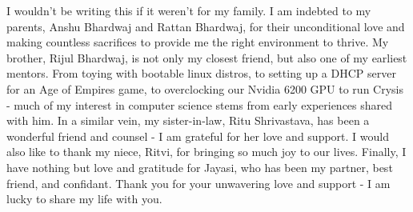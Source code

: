 \begin{acknowledgements}
I wouldn't be writing this if it weren't for my family. I am indebted to my parents, Anshu Bhardwaj and Rattan Bhardwaj, for their unconditional love and making countless sacrifices to provide me the right environment to thrive. My brother, Rijul Bhardwaj, is not only my closest friend, but also one of my earliest mentors. From toying with bootable linux distros, to setting up a DHCP server for an Age of Empires game, to overclocking our Nvidia 6200 GPU to run Crysis - much of my interest in computer science stems from early experiences shared with him. In a similar vein, my sister-in-law, Ritu Shrivastava, has been a wonderful friend and counsel - I am grateful for her love and support. I would also like to thank my niece, Ritvi, for bringing so much joy to our lives. Finally, I have nothing but love and gratitude for Jayasi, who has been my partner, best friend, and confidant. Thank you for your unwavering love and support - I am lucky to share my life with you.















\end{acknowledgements}